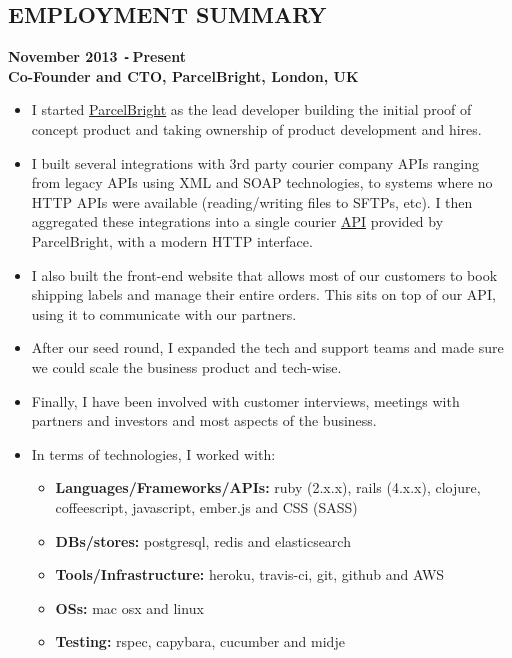 \documentclass{res}
\def\Minus{\texttt{-}\,}
\begin{document}
\begin{resume}
\section{EMPLOYMENT SUMMARY}
\vspace{0.1in}
  {\bf November 2013 \Minus Present}\\
  {\bf Co-Founder and CTO, ParcelBright, London, UK}
    \begin{itemize}
      \item[] I started \href{https://www.parcelbright.com/}{ParcelBright} as
        the lead developer building the initial proof of concept product and
        taking ownership of product development and hires.
      \item[] I built several integrations with 3rd party courier company
        APIs ranging from legacy APIs using XML and SOAP technologies, to
        systems where no HTTP APIs were available (reading/writing files to
        SFTPs, etc). I then aggregated these integrations into a single
        courier \href{https://github.com/parcelbright/api-docs}{API} provided by
        ParcelBright, with a modern HTTP interface.
      \item[] I also built the front-end website that allows most of our
        customers to book shipping labels and manage their entire orders. This
        sits on top of our API, using it to communicate with our partners.
      \item[] After our seed round, I expanded the tech and support teams
        and made sure we could scale the business product and tech-wise.
      \item[] Finally, I have been involved with customer interviews, meetings
        with partners and investors and most aspects of the business.
      \item[] In terms of technologies, I worked with:
      \begin{itemize}
        \item[] {\bf Languages/Frameworks/APIs:} ruby (2.x.x), rails
          (4.x.x), clojure, coffeescript, javascript, ember.js and CSS (SASS)
        \item[] {\bf DBs/stores:} postgresql, redis and elasticsearch
        \item[] {\bf Tools/Infrastructure:} heroku, travis-ci, git, github and
          AWS
        \item[] {\bf OSs:} mac osx and linux
        \item[] {\bf Testing:} rspec, capybara, cucumber and midje
      \end{itemize}
    \end{itemize}


\end{resume}
\end{document}

